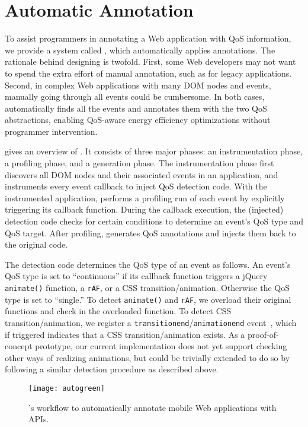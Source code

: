 \section{Automatic Annotation}
\label{sec:lang:auto}

To assist programmers in annotating a Web application with QoS information, we provide a system called \autogreen, which automatically applies \greenweb annotations. The rationale behind designing \autogreen is twofold. First, some Web developers may not want to spend the extra effort of manual annotation, such as for legacy applications. Second, in complex Web applications with many DOM nodes and events, manually going through all events could be cumbersome. In both cases, \autogreen automatically finds all the events and annotates them with the two QoS abstractions, enabling QoS-aware energy efficiency optimizations without programmer intervention.

 gives an overview of \autogreen. It consists of three major phases: an instrumentation phase, a profiling phase, and a generation phase. The instrumentation phase first discovers all DOM nodes and their associated events in an application, and instruments every event callback to inject QoS detection code. With the instrumented application, \autogreen performs a profiling run of each event by explicitly triggering its callback function. During the callback execution, the (injected) detection code checks for certain conditions to determine an event's QoS type and QoS target. After profiling, \autogreen generates QoS annotations and injects them back to the original code.

The detection code determines the QoS type of an event as follows. An event's QoS type is set to ``continuous'' if its callback function triggers a jQuery \texttt{animate()} function, a \texttt{rAF}, or a CSS transition/animation. Otherwise the QoS type is set to ``single.'' To detect \texttt{animate()} and \texttt{rAF}, we overload their original functions and check in the overloaded function. To detect CSS transition/animation, we register a \texttt{transitionend}/\texttt{animationend} event~\cite{csstransitionend,cssanimationend}, which if triggered indicates that a CSS transition/animation exists. As a proof-of-concept prototype, our current implementation does not yet support checking other ways of realizing animations, but could be trivially extended to do so by following a similar detection procedure as described above.

\begin{figure}[t]
  \centering
  \texttt{[image: autogreen]}
  \caption{\autogreen's workflow to automatically annotate mobile Web applications with \greenweb APIs.}
  \label{fig:autogreen}
\end{figure}

